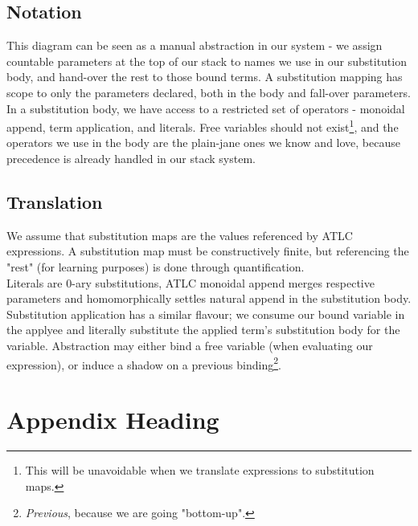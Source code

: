 \documentclass{article}
\begin{document}
\subsection{Notation}

\newcommand{\head}[1]{\node[shape = rectangle,
                            minimum width = 2cm] {::= $#1$};\\ }
\newcommand{\tail}[1]{\node[shape = rectangle,
                            minimum width = 2cm,
                            minimum height= 2cm] {$#1$};\\ }
\newcommand{\zero}{\draw (-1,0) -- (2,0);\\}


\begin{flushleft}
This diagram can be seen as a manual abstraction in our system - we assign
countable parameters at the top of our stack to names we use in our substitution
body, and hand-over the rest to those bound terms. A substitution mapping has
scope to only the parameters declared, both in the body and fall-over parameters.\\

In a substitution body, we have access to a restricted set of operators - monoidal
append, term application, and literals. Free variables should not exist\footnote{
  This will be unavoidable when we translate expressions to substitution maps.
}, and the operators we use in the body are the plain-jane ones we know and love,
because precedence is already handled in our stack system.
\end{flushleft}

\subsection{Translation}

\begin{flushleft}
We assume that substitution maps are the values referenced by ATLC expressions.
A substitution map must be constructively finite, but referencing the "rest"
(for learning purposes) is done through quantification.\\

Literals are 0-ary substitutions, ATLC monoidal append merges respective parameters
and homomorphically settles natural append in the substitution body. Substitution
application has a similar flavour; we consume our bound variable in the applyee
and literally substitute the applied term's substitution body for the variable.
Abstraction may either bind a free variable (when evaluating our expression),
or induce a shadow on a previous binding\footnote{\textit{Previous}, because we
are going "bottom-up".}.
\end{flushleft}




\appendix

\section{Appendix Heading}

\begin{flushleft}

\end{flushleft}
\end{document}
